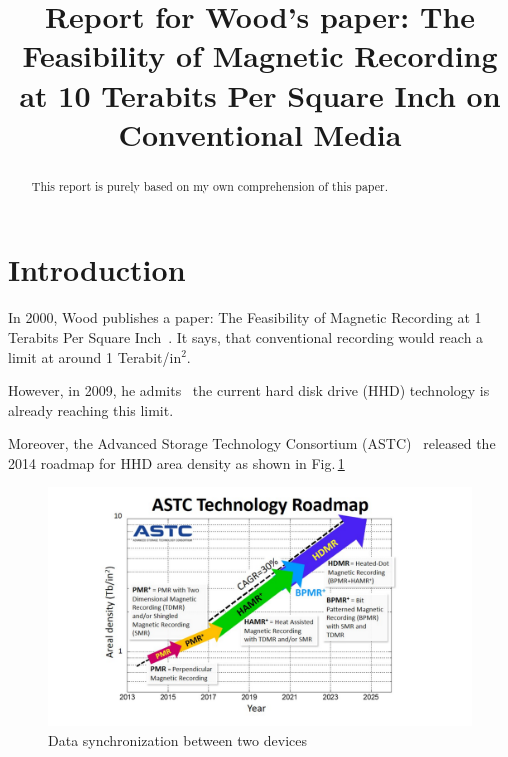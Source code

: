 \documentclass[conference]{IEEEtran}
\begin{document}
\title{Report for Wood's paper: 
The Feasibility of Magnetic Recording at 10 Terabits Per Square Inch on Conventional Media}

\author{
}

\maketitle

\begin{abstract}
This report is purely based on my own comprehension of this paper.
\end{abstract}

\IEEEpeerreviewmaketitle

\section{Introduction}
In 2000, Wood publishes a paper: The Feasibility of Magnetic Recording at 1 Terabits Per Square Inch~\cite{Wood2000}. It says, that conventional recording would reach a limit at around 1 Terabit/in$^2$.

However, in 2009, he admits~\cite{Wood2009} the current hard disk drive (HHD) technology is already reaching this limit.

Moreover, the Advanced Storage Technology Consortium (ASTC)~\cite{ASTC} released the 2014 roadmap for HHD area density as shown in Fig.\,\ref{fig_astc}

\begin{figure}[!hbt]
\includegraphics[height=0.25\textheight]{ASTC}
\caption{Data synchronization between two devices}
\label{fig_astc}
\end{figure}
\end{document}
